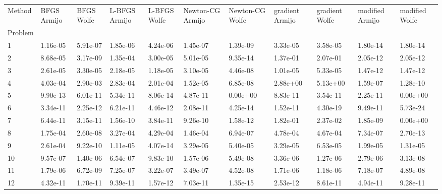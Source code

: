 \begin{tabular}{lllllllllll}
\toprule
Method & BFGS Armijo & BFGS Wolfe & L-BFGS Armijo & L-BFGS Wolfe & Newton-CG Armijo & Newton-CG Wolfe & gradient Armijo & gradient Wolfe & modified Armijo & modified Wolfe \\
Problem &             &            &               &              &                  &                 &                 &                &                 &                \\
\midrule
1       &    1.16e-05 &   5.91e-07 &      1.85e-06 &     4.24e-06 &         1.45e-07 &        1.39e-09 &        3.33e-05 &       3.58e-05 &        1.80e-14 &       1.80e-14 \\
2       &    8.68e-05 &   3.17e-09 &      1.35e-04 &     3.00e-05 &         5.01e-05 &        9.35e-14 &        1.37e-01 &       2.07e-01 &        2.05e-12 &       2.05e-12 \\
3       &    2.61e-05 &   3.30e-05 &      2.18e-05 &     1.18e-05 &         3.10e-05 &        4.46e-08 &        1.01e-05 &       5.33e-05 &        1.47e-12 &       1.47e-12 \\
4       &    4.03e-04 &   2.90e-03 &      2.83e-04 &     2.01e-04 &         1.52e-05 &        6.85e-08 &        2.88e+00 &       5.13e+00 &        1.59e-07 &       1.28e-10 \\
5       &    9.90e-13 &   6.01e-11 &      5.34e-11 &     8.06e-14 &         4.87e-11 &        0.00e+00 &        8.83e-11 &       3.54e-11 &        2.25e-11 &       0.00e+00 \\
6       &    3.34e-11 &   2.25e-12 &      6.21e-11 &     4.46e-12 &         2.08e-11 &        4.25e-14 &        1.52e-11 &       4.30e-19 &        9.49e-11 &       5.73e-24 \\
7       &    6.44e-11 &   3.15e-11 &      1.56e-10 &     3.84e-11 &         9.26e-10 &        1.58e-12 &        1.82e-01 &       2.37e-02 &        1.85e-09 &       0.00e+00 \\
8       &    1.75e-04 &   2.60e-08 &      3.27e-04 &     4.29e-04 &         1.46e-04 &        6.94e-07 &        4.78e-04 &       4.67e-04 &        7.34e-07 &       2.70e-13 \\
9       &    2.61e-04 &   9.22e-10 &      1.11e-05 &     4.07e-14 &         3.29e-05 &        5.40e-05 &        3.29e-05 &       6.53e-05 &        1.99e-05 &       1.31e-05 \\
10      &    9.57e-07 &   1.40e-06 &      6.54e-07 &     9.83e-10 &         1.57e-06 &        5.49e-08 &        3.36e-06 &       1.27e-06 &        2.79e-06 &       3.13e-08 \\
11      &    1.79e-06 &   6.72e-09 &      7.25e-07 &     3.22e-07 &         3.49e-07 &        4.52e-08 &        1.71e-06 &       1.18e-06 &        7.18e-07 &       4.89e-08 \\
12      &    4.32e-11 &   1.70e-11 &      9.39e-11 &     1.57e-12 &         7.03e-11 &        1.35e-15 &        2.53e-12 &       8.61e-11 &        4.94e-11 &       9.28e-11 \\
\bottomrule
\end{tabular}
